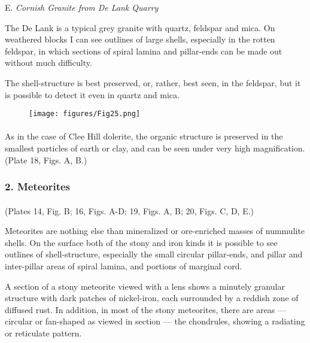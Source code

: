 \documentclass[a4paper, 12pt, oneside]{article}
\begin{document}
\bigskip
\centerline{E. \emph{Cornish Granite from De Lank Quarry}}

The De Lank is a typical grey granite with quartz, feldspar and mica. On weathered blocks I can see outlines of large shells, especially in the rotten feldspar, in which sections of spiral lamina and pillar-ends can be made out without much difficulty.

The shell-structure is best preserved, or, rather, best seen, in the feldspar, but it is possible to detect it even in quartz and mica.
\begin{figure}[H]
\centering
\texttt{[image: figures/Fig25.png]}
\caption*{}
\end{figure}
\paragraph{}
As in the case of Clee Hill dolerite, the organic structure is preserved in the smallest particles of earth or clay, and can be seen under very high magnification. (Plate 18, Figs. A, B.)

\subsubsection{2. Meteorites}
\paragraph{}
(Plates 14, Fig. B; 16, Figs. A-D; 19, Figs. A, B; 20, Figs. C, D, E.)

Meteorites are nothing else than mineralized or ore-enriched masses of nummulite shells. On the surface both of the stony and iron kinds it is possible to see outlines of shell-structure, especially the small circular pillar-ends, and pillar and inter-pillar areas of spiral lamina, and portions of marginal cord.

A section of a stony meteorite viewed with a lens shows a minutely granular structure with dark patches of nickel-iron, each surrounded by a reddish zone of diffused rust. In addition, in most of the stony meteorites, there are areas --- circular or fan-shaped as viewed in section --- the chondrules, showing a radiating or reticulate pattern.
\end{document}
